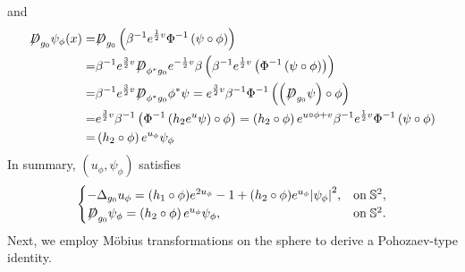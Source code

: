 \documentclass[a4paper, 12pt]{article}
\def\slashiii#1{\setbox0=\hbox{$#1$}#1\hskip-\wd0\hbox to\wd0{\hss\sl/\/\hss}}
\begin{document}
and
\[\begin{aligned}
	{\slashiii{D}_{{g_0}}}{\psi _\phi }(x) =& {\slashiii{D}_{{g_0}}}\left( {{\beta ^{ - 1}}{e^{\frac{1}{2}v}}{\Phi ^{ - 1}}\left( {\psi  \circ \phi } \right)} \right)  \\
	=& {\beta ^{ - 1}}{e^{\frac{3}{2}v}}{\slashiii{D}_{{\phi ^*}{g_0}}}{e^{ - \frac{1}{2}v}}\beta \left( {{\beta ^{ - 1}}{e^{\frac{1}{2}v}}\left( {{\Phi ^{ - 1}}\left( {\psi  \circ \phi } \right)} \right)} \right)  \\
	=& {\beta ^{ - 1}}{e^{\frac{3}{2}v}}{\slashiii{D}_{{\phi ^*}{g_0}}}{\phi ^*}\psi  = {e^{\frac{3}{2}v}}{\beta ^{ - 1}}{\Phi ^{ - 1}}\left( {\left( {{\slashiii{D}_{{g_0}}}\psi } \right) \circ \phi } \right)  \\
	=& {e^{\frac{3}{2}v}}{\beta ^{ - 1}}\left( {{\Phi ^{ - 1}}\left( {h_2{e^u}\psi } \right) \circ \phi } \right)  = \left(h_2\circ \phi\right){e^{u \circ \phi  + v}}{\beta ^{ - 1}}{e^{\frac{1}{2}v}}{\Phi ^{ - 1}}\left( {\psi  \circ \phi } \right)  \\
	=& \left(h_2\circ \phi\right){e^{{u_\phi }}}{\psi _\phi }
\end{aligned} \]
In summary, \((u_{\phi}, \psi_{\phi})\) satisfies \begin{equation}
	\begin{cases}
		{ - \Delta_{g_0} u_\phi = {(h_1\circ\phi)}{e^{2u_\phi}} - 1 + \left(h_2\circ \phi\right)}{e^{u_\phi}{{\left| \psi_\phi  \right|}^2},}&{{\text{on}}\;{\mathbb{S}^2},} \\
		{\slashiii{D}_{g_0}\psi_\phi  =\left(h_2\circ \phi\right)  {e^{u_\phi}}\psi_\phi ,}&{{\text{on}}\;{\mathbb{S}^2}.}
	\end{cases}
\end{equation}
Next, we employ M\"obius transformations on the sphere to derive a Pohozaev-type identity.

\
\end{document}
